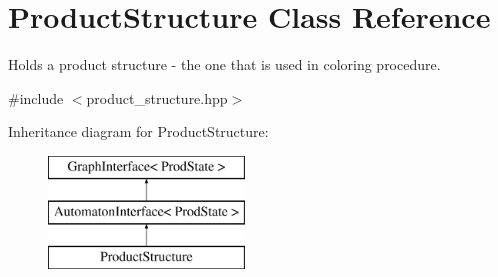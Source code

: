 \hypertarget{classProductStructure}{\section{\-Product\-Structure \-Class \-Reference}
\label{classProductStructure}
}


\-Holds a product structure -\/ the one that is used in coloring procedure.  




{\ttfamily \#include $<$product\-\_\-structure.\-hpp$>$}

\-Inheritance diagram for \-Product\-Structure\-:\begin{figure}[H]
\begin{center}
\leavevmode
\includegraphics[height=3.000000cm]{classProductStructure}
\end{center}
\end{figure}
